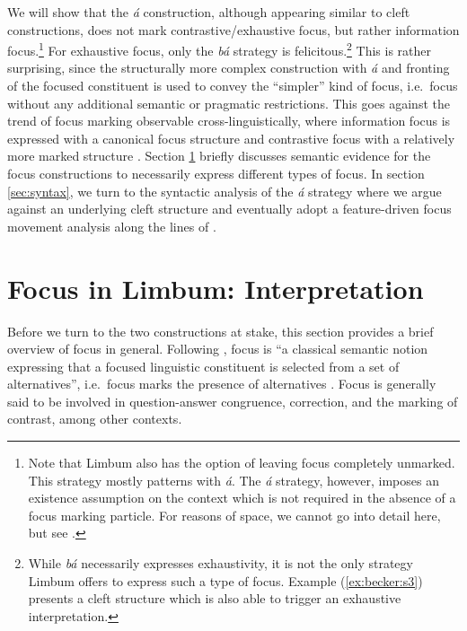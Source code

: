 \documentclass[output=paper,
modfonts
]{langscibook}
\begin{document}
We will show that the \textit{á} construction, although appearing similar to cleft constructions, does not mark contrastive/exhaustive focus, but rather information focus.\footnote{\label{footnote:becker:fn1}Note that Limbum also has the option of leaving focus completely unmarked. This strategy mostly patterns with {\em\'a}. The {\em \'a} strategy, however, imposes an existence assumption \citep{Dryer1996} on the context which is not required in the absence of a focus marking particle. For reasons of space, we cannot go into detail here, but see \citet{Driemeltoappear}.} For exhaustive focus, only the \textit{bá} strategy is felicitous.\footnote{While {\em b\'a} necessarily expresses exhaustivity, it is not the only strategy Limbum offers to express such a type of focus. Example (\ref{ex:becker:s3}) presents a cleft structure which is also able to trigger an exhaustive interpretation.} This is rather surprising, since the structurally more complex construction with \textit{á} and fronting of the focused constituent is used to convey the ``simpler'' kind of focus, i.e.\ focus without any additional semantic or pragmatic restrictions. This goes against the trend of focus marking observable cross-linguistically, where information focus is expressed with a canonical focus structure and contrastive focus with a relatively more marked structure \citep{Zimmermann2011a}. Section \ref{sec:semantics} briefly discusses semantic evidence for the focus constructions to necessarily express different types of focus. In section \ref{sec:syntax}, we turn to the syntactic analysis of the {\em \'a} strategy where we argue against an underlying cleft structure and eventually adopt a feature-driven focus movement analysis along the lines of \citet{Cable2010}.



\section{Focus in Limbum: Interpretation}\label{sec:semantics}

Before we turn to the two constructions at stake, this section provides a brief overview of focus in general. Following \citet[2]{Zimmermann2010}, focus is ``a classical semantic notion expressing that a focused linguistic constituent is selected from a set of alternatives'', i.e.\ focus marks the presence of alternatives \citep{Rooth1992,Krifk2008}. Focus is generally said to be involved in question-answer congruence, correction, and the marking of contrast, among other contexts.
\end{document}
